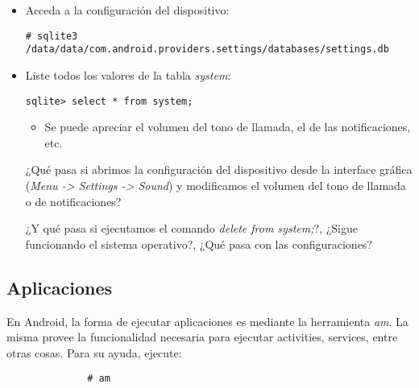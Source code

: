 \begin{itemize}
    \item Acceda a la configuración del dispositivo:
    \begin{lstlisting}
# sqlite3 /data/data/com.android.providers.settings/databases/settings.db
    \end{lstlisting}

    \item Liste todos los valores de la tabla \emph{system}:
    \begin{lstlisting}
sqlite> select * from system;
    \end{lstlisting}
    
    \begin{itemize}
	\item Se puede apreciar el volumen del tono de llamada, el de las notificaciones, etc.    
    \end{itemize}
    
    \begin{questions}
	\question ¿Qué pasa si abrimos la configuración del dispositivo desde la interface gráfica (\emph{Menu -> Settings -> Sound}) y modificamos el volumen del tono de llamada o de notificaciones?
	
	\question ¿Y qué pasa si ejecutamos el comando \textit{delete from system;}?, ¿Sigue funcionando el sistema operativo?, ¿Qué pasa con las configuraciones?
    \end{questions}
\end{itemize}

\subsection{Aplicaciones}
En Android, la forma de ejecutar aplicaciones es mediante la herramienta \textit{am}. La misma provee la funcionalidad necesaria para ejecutar activities, services, entre otras cosas.
Para su ayuda, ejecute:
\begin{lstlisting}
		      # am
\end{lstlisting}

